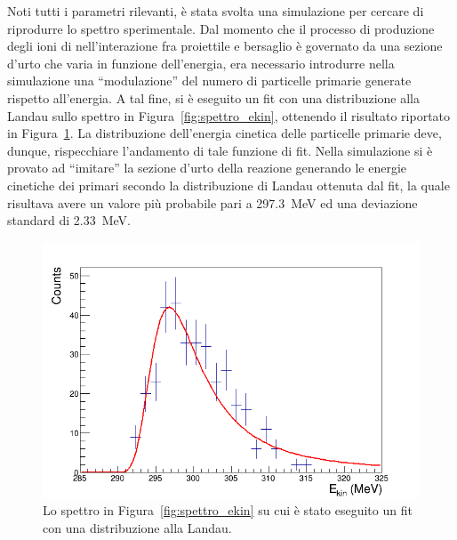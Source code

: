 Noti tutti i parametri rilevanti, è stata svolta una simulazione per cercare di riprodurre lo spettro sperimentale. 
Dal momento che il processo di produzione degli ioni di  nell'interazione fra proiettile e bersaglio è governato da una sezione d'urto che varia in funzione dell'energia, era necessario introdurre nella simulazione una ``modulazione'' del numero di particelle primarie generate rispetto all'energia.
A tal fine, si è eseguito un fit con una distribuzione alla Landau sullo spettro in Figura~\ref{fig:spettro_ekin}, ottenendo il risultato riportato in Figura~\ref{fig:spettro_ekin_fit}.
La distribuzione dell'energia cinetica delle particelle primarie deve, dunque, rispecchiare l'andamento di tale funzione di fit.
Nella simulazione si è provato ad ``imitare'' la sezione d'urto della reazione generando le energie cinetiche dei primari secondo la distribuzione di Landau ottenuta dal fit, la quale risultava avere un valore più probabile pari a 297.3~MeV ed una deviazione standard di 2.33~MeV.



\begin{figure} [!t]
	\centering
	\includegraphics[width=\textwidth, keepaspectratio]{Grafici_Tesi/Test/spettro_ekin_fit2.png}
	\caption{Lo spettro in Figura~\ref{fig:spettro_ekin} su cui è stato eseguito un fit con una distribuzione alla Landau.} \label{fig:spettro_ekin_fit}
\end{figure}

